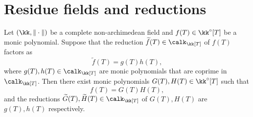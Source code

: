 \section{Residue fields and reductions}

    \begin{theorem}\label{prop:Hensel_lemma}
        Let \((\kk,\|\cdot\|)\) be a complete non-archimedean field and \(f(T) \in \kk^\circ[T]\) be a monic polynomial.
        Suppose that the reduction \(\widetilde{f}(T) \in \calk_\kk[T]\) of \(f(T)\) factors as
        \[ \widetilde{f}(T) = g(T) h(T), \]
        where \(g(T), h(T) \in \calk_\kk[T]\) are monic polynomials that are coprime in \(\calk_\kk[T]\).
        Then there exist monic polynomials \(G(T), H(T) \in \kk^\circ[T]\) such that
        \[ f(T) = G(T) H(T), \]
        and the reductions \(\widetilde{G}(T), \widetilde{H}(T) \in \calk_\kk[T]\) of \(G(T), H(T)\) are \(g(T), h(T)\) respectively.
    \end{theorem}
